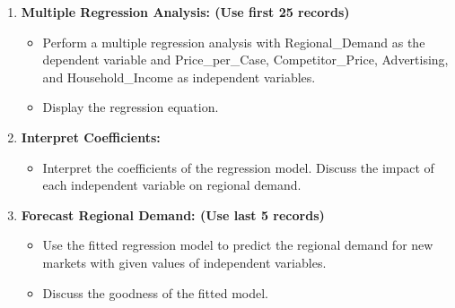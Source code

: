 \documentclass{article}
\begin{document}
\begin{enumerate}
    \item \textbf{Multiple Regression Analysis: (Use first 25 records)}
    \begin{itemize}
        \item Perform a multiple regression analysis with Regional\_Demand as the dependent variable and Price\_per\_Case, Competitor\_Price, Advertising, and Household\_Income as independent variables.
        \item Display the regression equation.
    \end{itemize}

    \item \textbf{Interpret Coefficients:}
    \begin{itemize}
        \item Interpret the coefficients of the regression model. Discuss the impact of each independent variable on regional demand.
    \end{itemize}

    \item \textbf{Forecast Regional Demand: (Use last 5 records)}
    \begin{itemize}
        \item Use the fitted regression model to predict the regional demand for new markets with given values of independent variables.
        \item Discuss the goodness of the fitted model.
    \end{itemize}
\end{enumerate}
\end{document}
